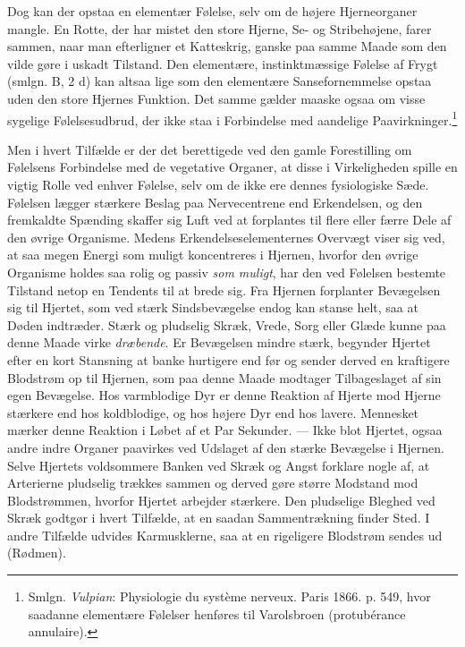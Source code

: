 \documentclass[12pt,a4paper,openany]{book}
\newcommand{\opage}[1]{\marginnote{\footnotesize\textit{[#1]}}}
\begin{document}
Dog kan der opstaa en elementær Følelse, selv om de højere Hjerneorganer
mangle. En Rotte, der har mistet den
\opage{320}store Hjerne, Se- og Stribehøjene, farer sammen, naar man
efterligner et Katteskrig, ganske paa samme Maade som den vilde gøre i
uskadt Tilstand. Den elementære, instinktmæssige Følelse af Frygt
(smlgn. B, 2 d) kan altsaa lige som den elementære Sansefornemmelse
opstaa uden den store Hjernes Funktion. Det samme gælder maaske ogsaa om
visse sygelige Følelsesudbrud, der ikke staa i Forbindelse med aandelige
Paavirkninger.\footnote[1]{Smlgn. \emph{Vulpian}: Physiologie du système
nerveux. Paris 1866. p. 549, hvor saadanne elementære Følelser henføres
til Varolsbroen (protubérance annulaire).}

Men i hvert Tilfælde er der det berettigede ved den gamle Forestilling
om Følelsens Forbindelse med de vegetative Organer, at disse i
Virkeligheden spille en vigtig Rolle ved enhver Følelse, selv om de ikke
ere dennes fysiologiske Sæde. Følelsen lægger stærkere Beslag paa
Nervecentrene end Erkendelsen, og den fremkaldte Spænding skaffer sig
Luft ved at forplantes til flere eller færre Dele af den øvrige
Organisme. Medens Erkendelseselementernes Overvægt viser sig ved, at saa
megen Energi som muligt koncentreres i Hjernen, hvorfor den øvrige
Organisme holdes saa rolig og passiv \emph{som muligt}, har den ved
Følelsen bestemte Tilstand netop en Tendents til at brede sig. Fra
Hjernen forplanter Bevægelsen sig til Hjertet, som ved stærk
Sindsbevægelse endog kan stanse helt, saa at Døden indtræder. Stærk og
pludselig Skræk, Vrede, Sorg eller Glæde kunne paa denne Maade virke
\emph{dræbende}. Er Bevægelsen mindre stærk, begynder Hjertet efter en
kort Stansning at banke hurtigere end før og sender derved en kraftigere
Blodstrøm op til Hjernen, som paa denne Maade modtager Tilbageslaget af
sin egen Bevægelse. Hos varmblodige Dyr er denne Reaktion af Hjerte mod
Hjerne stærkere end hos koldblodige, og hos højere Dyr end hos lavere.
Mennesket mærker denne Reaktion i Løbet af et Par Sekunder. --- Ikke
blot Hjertet, ogsaa andre indre Organer paavirkes ved Udslaget af den
stærke Bevægelse i Hjernen. Selve Hjertets voldsommere Banken ved Skræk
og Angst forklare nogle af, at Arterierne pludselig trækkes sammen og
derved gøre større Modstand mod Blodstrømmen, hvorfor Hjertet arbejder
stærkere.
\opage{321}Den pludselige Bleghed ved Skræk godtgør i hvert Tilfælde, at
en saadan Sammentrækning finder Sted. I andre Tilfælde udvides
Karmusklerne, saa at en rigeligere Blodstrøm sendes ud (Rødmen).
\end{document}
